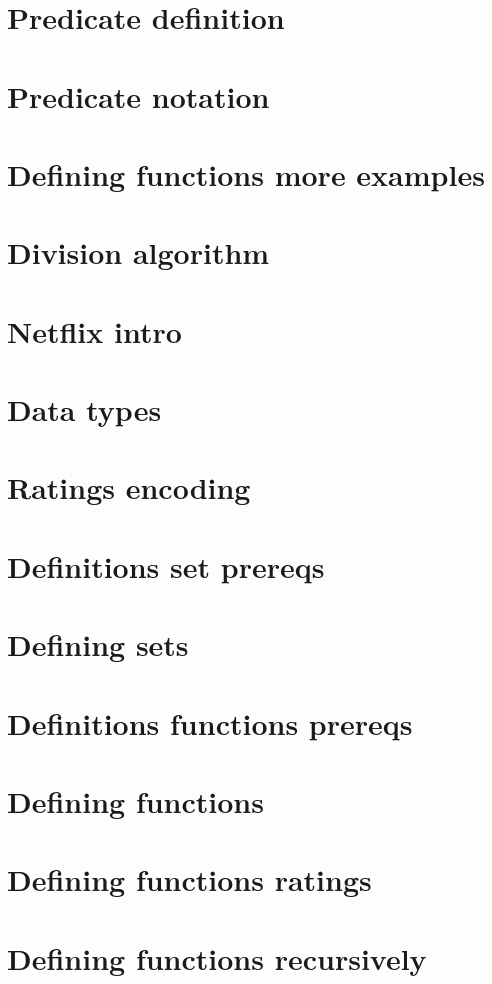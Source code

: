 
\section*{Predicate definition}

\vfill
\section*{Predicate notation}

\vfill
\section*{Defining functions more examples}

\vfill
\section*{Division algorithm}

\vfill
\section*{Netflix intro}

\vfill
\section*{Data types}

\vfill
\section*{Ratings encoding}

\vfill
\section*{Definitions set prereqs}

\vfill
\section*{Defining sets}

\vfill
\section*{Definitions functions prereqs}

\vfill
\section*{Defining functions}

\vfill
\section*{Defining functions ratings}

\vfill
\section*{Defining functions recursively}

\vfill
